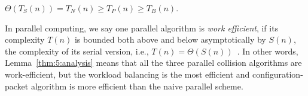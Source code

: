 \begin{lemma}
\label{thm:5:analysis}
$\Theta(T_S(n)) = T_N(n) \geq T_P(n) \geq T_B(n)$.
\end{lemma}

\begin{remark} In parallel computing, we say one parallel algorithm is \emph{work efficient}, if its complexity $T(n)$ is bounded both above and below asymptotically by $S(n)$, the complexity of its serial version, i.e., $T(n) = \Theta(S(n))$~\cite{Joesphbook}. In other words, Lemma~\ref{thm:5:analysis} means that all the three parallel collision algorithms are work-efficient, but the workload balancing is the most efficient and configuration-packet algorithm is more efficient than the naive parallel scheme.
\end{remark}

